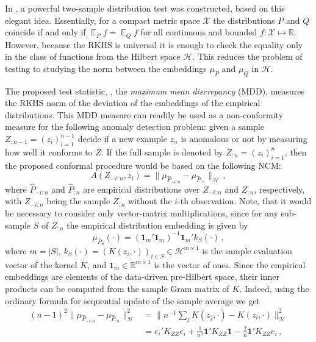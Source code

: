 \documentclass{extarticle}
\newcommand{\ex}{\mathop{\mathbb{E}}\nolimits}
\newcommand{\Hcal}{\mathcal{H}}
\newcommand{\Xcal}{\mathcal{X}}
\newcommand{\Real}{\mathbb{R}}
\newcommand{\one}{\mathbf{1}}
\begin{document}
In \cite{gretton2012}, a powerful two-sample distribution test was constructed, based
on this elegant idea. Essentially, for a compact metric space $\Xcal$ the distributions
$P$ and $Q$ coincide if and only if $\ex_P f = \ex_Q f$ for all continuous and bounded
$f:\Xcal\mapsto \Real$. However, because the RKHS is universal it is enough to check
the equality only in the class of functions from the Hilbert space $\Hcal$. This
reduces the problem of testing to studying the norm between the embeddings $\mu_P$
and $\mu_Q$ in $\Hcal$.

The proposed test statistic, \cite{gretton2012}, the \textit{maximum mean discrepancy}
(MDD), measures the RKHS norm of the deviation of the embeddings of the empirical
distributions. This MDD measure can readily be used as a non-conformity measure
for the following anomaly detection problem: given a sample $Z_{:n-1} = (z_i)_{i=1}^{n-1}$
decide if a new example $z_n$ is anomalous or not by measuring how well it conforms
to $Z$. If the full sample is denoted by $Z_{:n} = (z_i)_{i=1}^n$, then the proposed
conformal procedure would be based on the following NCM:
\begin{equation*}
  A(Z_{-i:n}, z_i) = \| \mu_{\hat{P}_{-i:n}} - \mu_{\hat{P}_{:n}} \|_{\Hcal} \,,
\end{equation*}
where $\hat{P}_{-i:n}$ and $\hat{P}_{:n}$ are empirical distributions over $Z_{-i:n}$
and $Z_{:n}$, respectively, with $Z_{-i:n}$ being the sample $Z_{:n}$ without the
$i$-th observation. Note, that it would be necessary to consider only vector-matrix
multiplications, since for any sub-sample $S$ of $Z_{:n}$ the empirical distribution
embedding is given by
\begin{equation*}
  \mu_{\hat{P}_S}(\cdot) = (\one_m'\one_m)^{-1} \one_m' k_S(\cdot) \,,
\end{equation*}
where $m = |S|$, $k_S(\cdot) = (K(z_i, \cdot))_{i\in S} \in \Hcal^{m\times 1}$ is
the sample evaluation vector of the kernel $K$, and $\one_m \in \Real^{m\times 1}$
is the vector of ones. Since the empirical embeddings are elements of the data-driven
pre-Hilbert space, their inner products can be computed from the sample Gram matrix
of $K$. Indeed, using the ordinary formula for sequential update of the sample average
we get
\begin{align*}
  (n-1)^2 \bigl\|\mu_{\hat{P}_{-i:n}} - \mu_{\hat{P}_{:n}} \bigr\|^2_\Hcal
    &= \bigl\| n^{-1} \sum_j K(z_j, \cdot) - K(z_i, \cdot) \bigr\|^2_\Hcal \\
    &= e_i'K_{ZZ} e_i + \frac{1}{n^2} \one' K_{ZZ} \one - \frac{2}{n} \one' K_{ZZ} e_i \,,
\end{align*}
\end{document}
